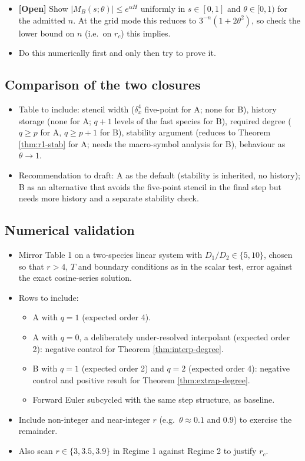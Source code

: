 \begin{itemize}
  \item \textbf{[Open]} Show $|M_B(s;\theta)| \le e^{\alpha H}$ uniformly in $s \in [0,1]$ and $\theta \in [0,1)$ for the admitted $n$. At the grid mode this reduces to $3^{-n}(1+2\theta^2)$, so check the lower bound on $n$ (i.e.\ on $r_c$) this implies.
  \item Do this numerically first and only then try to prove it.
\end{itemize}

\subsection{Comparison of the two closures}

\begin{itemize}
  \item Table to include: stencil width ($\delta_x^4$ five-point for A; none for B), history storage (none for A; $q+1$ levels of the fast species for B), required degree ($q \ge p$ for A, $q \ge p+1$ for B), stability argument (reduces to Theorem \ref{thm:r1-stab} for A; needs the macro-symbol analysis for B), behaviour as $\theta \to 1$.
  \item Recommendation to draft: A as the default (stability is inherited, no history); B as an alternative that avoids the five-point stencil in the final step but needs more history and a separate stability check.
\end{itemize}

\subsection{Numerical validation}

\begin{itemize}
  \item Mirror Table 1 on a two-species linear system with $D_1/D_2 \in \{5, 10\}$, chosen so that $r > 4$, $T$ and boundary conditions as in the scalar test, error against the exact cosine-series solution.
  \item Rows to include:
  \begin{itemize}
    \item A with $q = 1$ (expected order 4).
    \item A with $q = 0$, a deliberately under-resolved interpolant (expected order 2): negative control for Theorem \ref{thm:interp-degree}.
    \item B with $q = 1$ (expected order 2) and $q = 2$ (expected order 4): negative control and positive result for Theorem \ref{thm:extrap-degree}.
    \item Forward Euler subcycled with the same step structure, as baseline.
  \end{itemize}
  \item Include non-integer and near-integer $r$ (e.g.\ $\theta \approx 0.1$ and $0.9$) to exercise the remainder.
  \item Also scan $r \in \{3, 3.5, 3.9\}$ in Regime 1 against Regime 2 to justify $r_c$.
\end{itemize}

